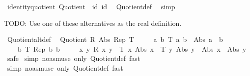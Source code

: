 \begin{isabellebody}
%
\isadelimproof
\isanewline
%
\endisadelimproof
\isanewline
{}\isamarkupfalse%
\isanewline
\isanewline
{}\isamarkupfalse%
\ identity{\isacharunderscore}{\kern0pt}quotient{\isacharcolon}{\kern0pt}\ {\isachardoublequoteopen}Quotient\ {\isacharparenleft}{\kern0pt}{\isacharequal}{\kern0pt}{\isacharparenright}{\kern0pt}\ id\ id\ {\isacharparenleft}{\kern0pt}{\isacharequal}{\kern0pt}{\isacharparenright}{\kern0pt}{\isachardoublequoteclose}\isanewline
%
\isadelimproof
%
\endisadelimproof
%
\isatagproof
{}\isamarkupfalse%
\ Quotient{\isacharunderscore}{\kern0pt}def\ \isamarkupfalse%
\ simp%
\endisatagproof
{\isafoldproof}%
%
\isadelimproof
%
\endisadelimproof
%
\begin{isamarkuptext}%
TODO: Use one of these alternatives as the real definition.%
\end{isamarkuptext}\isamarkuptrue%
\isamarkupfalse%
\ Quotient{\isacharunderscore}{\kern0pt}alt{\isacharunderscore}{\kern0pt}def{\isacharcolon}{\kern0pt}\isanewline
\ \ {\isachardoublequoteopen}Quotient\ R\ Abs\ Rep\ T\ {\isasymlongleftrightarrow}\isanewline
\ \ \ \ {\isacharparenleft}{\kern0pt}{\isasymforall}a\ b{\isachardot}{\kern0pt}\ T\ a\ b\ {\isasymlongrightarrow}\ Abs\ a\ {\isacharequal}{\kern0pt}\ b{\isacharparenright}{\kern0pt}\ {\isasymand}\isanewline
\ \ \ \ {\isacharparenleft}{\kern0pt}{\isasymforall}b{\isachardot}{\kern0pt}\ T\ {\isacharparenleft}{\kern0pt}Rep\ b{\isacharparenright}{\kern0pt}\ b{\isacharparenright}{\kern0pt}\ {\isasymand}\isanewline
\ \ \ \ {\isacharparenleft}{\kern0pt}{\isasymforall}x\ y{\isachardot}{\kern0pt}\ R\ x\ y\ {\isasymlongleftrightarrow}\ T\ x\ {\isacharparenleft}{\kern0pt}Abs\ x{\isacharparenright}{\kern0pt}\ {\isasymand}\ T\ y\ {\isacharparenleft}{\kern0pt}Abs\ y{\isacharparenright}{\kern0pt}\ {\isasymand}\ Abs\ x\ {\isacharequal}{\kern0pt}\ Abs\ y{\isacharparenright}{\kern0pt}{\isachardoublequoteclose}\isanewline
%
\isadelimproof
%
\endisadelimproof
%
\isatagproof
{}\isamarkupfalse%
\ safe\isanewline
{}\isamarkupfalse%
\ {\isacharparenleft}{\kern0pt}simp\ {\isacharparenleft}{\kern0pt}no{\isacharunderscore}{\kern0pt}asm{\isacharunderscore}{\kern0pt}use{\isacharparenright}{\kern0pt}\ only{\isacharcolon}{\kern0pt}\ Quotient{\isacharunderscore}{\kern0pt}def{\isacharcomma}{\kern0pt}\ fast{\isacharparenright}{\kern0pt}\isanewline
{}\isamarkupfalse%
\ {\isacharparenleft}{\kern0pt}simp\ {\isacharparenleft}{\kern0pt}no{\isacharunderscore}{\kern0pt}asm{\isacharunderscore}{\kern0pt}use{\isacharparenright}{\kern0pt}\ only{\isacharcolon}{\kern0pt}\ Quotient{\isacharunderscore}{\kern0pt}def{\isacharcomma}{\kern0pt}\ fast{\isacharparenright}{\kern0pt}\isanewline

\end{isabellebody}
